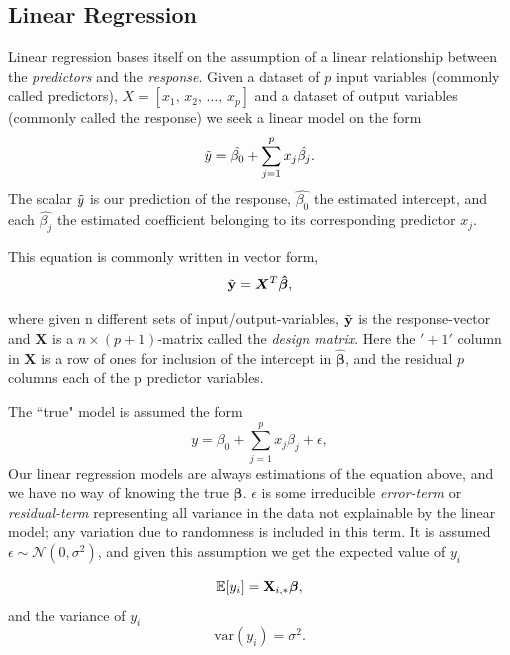 \subsection{Linear Regression}
Linear regression bases itself on the assumption of a linear relationship between the \textit{predictors} and the \textit{response}. 
Given a dataset of $p$ input variables (commonly called predictors), $X=[x_1, \, x_2, \, \ldots, \, x_p]$ and a dataset of output variables (commonly called the response) we seek a linear model on the form
\begin{equation}
\Tilde{y}=\hat{\beta_0}+\sum_{j=1}^{p}x_j\hat{\beta_j}.
\end{equation}
The scalar $\Tilde{y}$ is our prediction of the response, $\hat{\beta_0}$ the estimated intercept, and each $\hat{\beta_j}$ the estimated coefficient belonging to its corresponding predictor $x_j$. 

This equation is commonly written in vector form, 
\begin{equation}
\Tilde{\mathbf{y}}=\boldsymbol{X}^T\boldsymbol{\hat{\beta}},
\end{equation}

where given n different sets of input/output-variables, $\Tilde{\mathbf{y}}$ is the response-vector and $\boldsymbol{X}$ is a $n\times (p+1)$-matrix called the \textit{design matrix}\label{design-matrix}. Here the $'+1'$ column in $\boldsymbol{X}$ is a row of ones for inclusion of the intercept in $\boldsymbol{\hat{\beta}}$, and the residual $p$ columns each of the p predictor variables. 


The ``true" model is assumed the form 
\begin{equation}\label{OG_y}
y=\beta_0+\sum_{j=1}^{p}x_j\beta_j+\epsilon,
\end{equation}
Our linear regression models are always estimations of the equation above, and we have no way of knowing the true $\boldsymbol{\beta}$. 
$\epsilon$ is some irreducible \textit{error-term} or \textit{residual-term} representing all variance in the data not explainable by the linear model; any variation due to randomness is included in this term. It is assumed $\epsilon \sim  
\mathcal{N}(0,\sigma^2)$, and given this assumption we get the expected value of $y_i$

\begin{equation}\label{expected_y}
    \mathbb{E}[y_i] = \mathbf{X}_{i,*}\boldsymbol{\beta},
\end{equation}
and the variance of $y_i$
\begin{equation}\label{var_y}
    \text{var}(y_i) = \sigma^2.
\end{equation}




